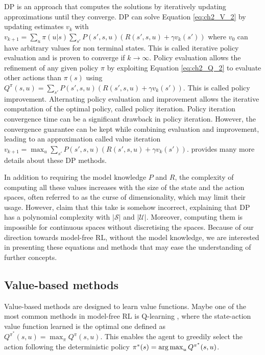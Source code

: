 DP is an approach that computes the solutions by iteratively updating approximations until they converge.
DP can solve Equation \ref{eq:ch2_V_2} by updating estimates $v_k$ with $v_{k+1} = \sum_{u} \pi(u|s) \sum_{s'} P(s', s, u) (R(s', s, u) + \gamma v_k(s'))$ where $v_0$ can have arbitrary values for non terminal states.
This is called iterative policy evaluation and is proven to converge if $k\rightarrow\infty$.
Policy evaluation allows the refinement of any given policy $\pi$ by exploiting Equation \ref{eq:ch2_Q_2} to evaluate other actions than $\pi(s)$ using $Q^\pi(s, u) =  \sum_{s'} P(s', s, u) (R(s', s, u) + \gamma v_k(s'))$. 
This is called policy improvement.
Alternating policy evaluation and improvement allows the iterative computation of the optimal policy, called policy iteration.
Policy iteration convergence time can be a significant drawback in policy iteration.
However, the convergence guarantee can be kept while combining evaluation and improvement, leading to an approximation called value iteration $v_{k+1} = \max_u \sum_{s'} P(s', s, u) (R(s', s, u) + \gamma v_k(s'))$.
\cite{sutton2018reinforcement} provides many more details about these DP methods.

In addition to requiring the model knowledge $P$ and $R$, the complexity of computing all these values increases with the size of the state and the action spaces, often referred to as the curse of dimensionality, which may limit their usage.
However, \cite{sutton2018reinforcement} claim that this take is somehow incorrect, explaining that DP has a polynomial complexity with $|\mathcal{S}|$ and $|\mathcal{U}|$.
Moreover, computing them is impossible for continuous spaces without discretising the spaces.
Because of our direction towards model-free RL, without the model knowledge, we are interested in presenting these equations and methods that may ease the understanding of further concepts.



\subsection{Value-based methods} \label{sec:ch2_value_based_methods}
Value-based methods are designed to learn value functions.
Maybe one of the most common methods in model-free RL is Q-learning \citep{watkins1992q}, where the state-action value function learned is the optimal one defined as $Q^{\pi^*}(s, u)=\max_{\pi}Q^\pi(s, u)$.
This enables the agent to greedily select the action following the deterministic policy $\pi^*(s)=\operatorname*{arg\,max}_u Q^{\pi^*}(s, u)$.

